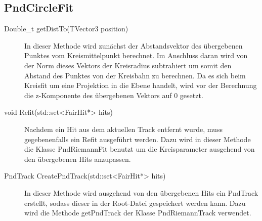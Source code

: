 \subsection{PndCircleFit}
\begin{description}
	\item[Double\_t getDistTo(TVector3 position)] In dieser Methode wird zunächst der Abstandsvektor des übergebenen Punktes vom Kreismittelpunkt berechnet. Im Anschluss daran wird von der Norm dieses Vektors der Kreisradius subtrahiert um somit den Abstand des Punktes von der Kreisbahn zu berechnen. Da es sich beim Kreisfit um eine Projektion in die Ebene handelt, wird vor der Berechnung die z-Komponente des übergebenen Vektors auf 0 gesetzt.


	\item[void Refit(std::set<FairHit*> hits)] Nachdem ein Hit aus dem aktuellen Track entfernt wurde, muss gegebenenfalls ein Refit ausgeführt werden. Dazu wird in dieser Methode die Klasse PndRiemannFit benutzt um die Kreisparameter ausgehend von den übergebenen Hits anzupassen.

	\item[PndTrack CreatePndTrack(std::set<FairHit*> hits)] In dieser Methode wird ausgehend von den übergebenen Hits ein PndTrack erstellt, sodass dieser in der Root-Datei gespeichert werden kann. Dazu wird die Methode getPndTrack der Klasse PndRiemannTrack verwendet.
\end{description}